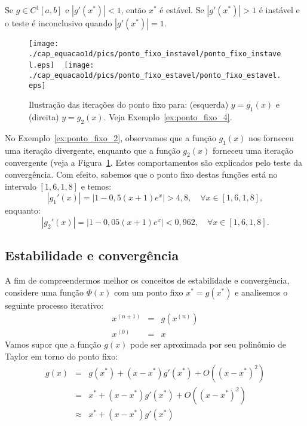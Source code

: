 \begin{prop}
 Se $g\in C^1[a,b]$ e  $|g'(x^*)|<1$, então $x^*$ é estável. Se $|g'(x^*)|>1$ é instável e o teste é inconclusivo quando $|g'(x^*)|=1$.
\end{prop}

\begin{figure}[h]
    \centering
        \texttt{[image: ./cap\_equacao1d/pics/ponto\_fixo\_instavel/ponto\_fixo\_instavel.eps]}
~
        \texttt{[image: ./cap\_equacao1d/pics/ponto\_fixo\_estavel/ponto\_fixo\_estavel.eps]}
    \caption{Ilustração das iterações do ponto fixo para: (esquerda) $y = g_1(x)$ e (direita) $y = g_2(x)$. Veja Exemplo~\ref{ex:ponto_fixo_4}.} \label{fig:teste_de_convergencia}
\end{figure}

\begin{ex}\label{ex:ponto_fixo_4}
  No Exemplo~\ref{ex:ponto_fixo_2}, observamos que a função $g_1(x)$ nos forneceu uma iteração divergente, enquanto que a função $g_2(x)$ forneceu uma iteração convergente (veja a Figura~\ref{fig:teste_de_convergencia}. Estes comportamentos são explicados pelo teste da convergência. Com efeito, sabemos que o ponto fixo destas funções está no intervalo $[1,6, 1,8]$ e temos:
  \begin{equation}
    |g_1'(x)| = |1 - 0,5(x+1)e^x| > 4,8,\quad\forall x\in [1,6, 1,8],
  \end{equation}
enquanto:
\begin{equation}
  |g_2'(x)| = |1 - 0,05(x+1)e^x| < 0,962,\quad\forall x\in [1,6, 1,8].
\end{equation}
\end{ex}

\subsection{Estabilidade e convergência}

A fim de compreendermos melhor os conceitos de estabilidade e convergência, considere uma função $\Phi(x)$ com um ponto fixo $x^*=g(x^*)$ e analisemos o seguinte processo iterativo:
\begin{eqnarray}
x^{(n+1)}&=&g\left(x^{(n)}\right)\\
x^{(0)}&=&x
\end{eqnarray}
Vamos supor que a função $g(x)$ pode ser aproximada por seu polinômio de Taylor em torno do ponto fixo:
\begin{eqnarray}
g(x)&=&g(x^*)+(x-x^*) g'(x^*)+O\left((x-x^*)^2\right)\\
&=&x^*+(x-x^*) g'(x^*)+O\left((x-x^*)^2\right)\\
&\approx& x^*+(x-x^*) g'(x^*)
\end{eqnarray}

